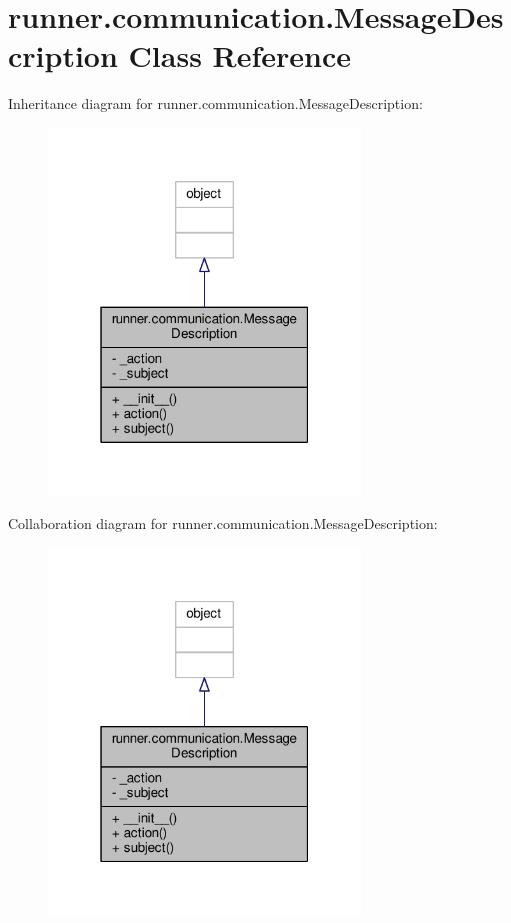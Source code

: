 \hypertarget{classrunner_1_1communication_1_1MessageDescription}{}\section{runner.\+communication.\+Message\+Description Class Reference}
\label{classrunner_1_1communication_1_1MessageDescription}


Inheritance diagram for runner.\+communication.\+Message\+Description\+:
\nopagebreak
\begin{figure}[H]
\begin{center}
\leavevmode
\includegraphics[width=235pt]{classrunner_1_1communication_1_1MessageDescription__inherit__graph}
\end{center}
\end{figure}


Collaboration diagram for runner.\+communication.\+Message\+Description\+:
\nopagebreak
\begin{figure}[H]
\begin{center}
\leavevmode
\includegraphics[width=235pt]{classrunner_1_1communication_1_1MessageDescription__coll__graph}
\end{center}
\end{figure}
